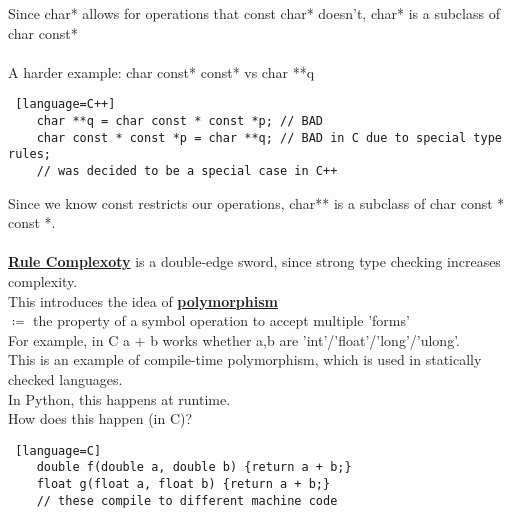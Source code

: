 \documentclass[../../lecture_notes.tex]{subfiles}
\begin{document}
Since char* allows for operations that const char* doesn't, char* is a subclass of char const*\\
\\
A harder example: char const* const* vs char **q
\begin{lstlisting} [language=C++]
	char **q = char const * const *p; // BAD
	char const * const *p = char **q; // BAD in C due to special type rules; 
	// was decided to be a special case in C++
\end{lstlisting}
Since we know const restricts our operations, char** is a subclass of char const * const *.\\
\\
\textbf{\underline{Rule Complexoty}} is a double-edge sword, since strong type checking increases complexity.\\
This introduces the idea of \textbf{\underline{polymorphism}}\\
\indent $\coloneqq$ the property of a symbol operation to accept multiple 'forms'\\
For example, in C a + b works whether a,b are 'int'/'float'/'long'/'ulong'.\\
	\indent This is an example of compile-time polymorphism, which is used in statically checked languages.\\
In Python, this happens at runtime.\\
How does this happen (in C)?
\begin{lstlisting} [language=C]
	double f(double a, double b) {return a + b;}
	float g(float a, float b) {return a + b;}
	// these compile to different machine code
\end{lstlisting}
\end{document}
